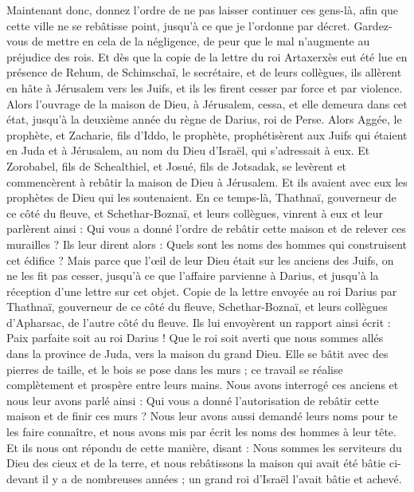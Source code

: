 \begin{multicols}{2}
Maintenant donc, donnez l'ordre de ne pas laisser continuer ces gens-là, afin que cette ville ne se rebâtisse point, jusqu'à ce que je l'ordonne par décret.
Gardez-vous de mettre en cela de la négligence, de peur que le mal n'augmente au préjudice des rois.
Et dès que la copie de la lettre du roi Artaxerxès eut été lue en présence de Rehum, de Schimschaï, le secrétaire, et de leurs collègues, ils allèrent en hâte à Jérusalem vers les Juifs, et ils les firent cesser par force et par violence.
Alors l'ouvrage de la maison de Dieu, à Jérusalem, cessa, et elle demeura dans cet état, jusqu'à la deuxième année du règne de Darius, roi de Perse.
\VerseOne{}Alors Aggée, le prophète, et Zacharie, fils d'Iddo, le prophète, prophétisèrent aux Juifs qui étaient en Juda et à Jérusalem, au nom du Dieu d'Israël, qui s'adressait à eux.
Et Zorobabel, fils de Schealthiel, et Josué, fils de Jotsadak, se levèrent et commencèrent à rebâtir la maison de Dieu à Jérusalem. Et ils avaient avec eux les prophètes de Dieu qui les soutenaient.
En ce temps-là, Thathnaï, gouverneur de ce côté du fleuve, et Schethar-Boznaï, et leurs collègues, vinrent à eux et leur parlèrent ainsi : Qui vous a donné l'ordre de rebâtir cette maison et de relever ces murailles ?
Ils leur dirent alors : Quels sont les noms des hommes qui construisent cet édifice ?
Mais parce que l'œil de leur Dieu était sur les anciens des Juifs, on ne les fit pas cesser, jusqu'à ce que l'affaire parvienne à Darius, et jusqu'à la réception d'une lettre sur cet objet.
Copie de la lettre envoyée au roi Darius par Thathnaï, gouverneur de ce côté du fleuve, Schethar-Boznaï, et leurs collègues d'Apharsac, de l'autre côté du fleuve.
Ils lui envoyèrent un rapport ainsi écrit : Paix parfaite soit au roi Darius !
Que le roi soit averti que nous sommes allés dans la province de Juda, vers la maison du grand Dieu. Elle se bâtit avec des pierres de taille, et le bois se pose dans les murs ; ce travail se réalise complètement et prospère entre leurs mains.
Nous avons interrogé ces anciens et nous leur avons parlé ainsi : Qui vous a donné l'autorisation de rebâtir cette maison et de finir ces murs ?
Nous leur avons aussi demandé leurs noms pour te les faire connaître, et nous avons mis par écrit les noms des hommes à leur tête.
Et ils nous ont répondu de cette manière, disant : Nous sommes les serviteurs du Dieu des cieux et de la terre, et nous rebâtissons la maison qui avait été bâtie ci-devant il y a de nombreuses années ; un grand roi d'Israël l'avait bâtie et achevé.

\end{multicols}
